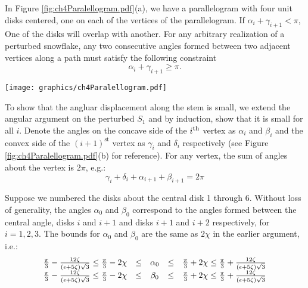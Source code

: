 In Figure \ref{fig:ch4Paralellogram.pdf}(a), we have a parallelogram with four unit disks centered, one on each of the vertices of the parallelogram.  
If $\alpha_i + \gamma_{i+1} < \pi$, One of the disks will overlap with another.  
For any arbitrary realization of a perturbed snowflake, any two consecutive angles formed between two adjacent vertices along a path must satisfy the following constraint $$\alpha_i + \gamma_{i+1} \geq \pi.$$

\begin{minipage}{\linewidth}
\begin{center}
\texttt{[image: graphics/ch4Paralellogram.pdf]}
\label{fig:ch4Paralellogram.pdf}
\end{center}
\end{minipage}

To show that the angluar displacement along the stem is small, we extend the angular argument on the perturbed $S_1$ and by induction, show that it is small for all $i$.  
Denote the angles on the concave side of the $i^\text{th}$ vertex as $\alpha_i$ and $\beta_i$ and the convex side of the $(i+1)^\text{st}$ vertex as $\gamma_i$ and $\delta_i$ respectively (see Figure \ref{fig:ch4Paralellogram.pdf}(b) for reference). 
For any vertex, the sum of angles about the vertex is $2 \pi$, e.g.:
$$\gamma_i + \delta_i + \alpha_{i+1} + \beta_{i+1} = 2 \pi$$ 

Suppose we numbered the disks about the central disk 1 through 6.  
Without loss of generality, the angles $\alpha_0$ and $\beta_0$ correspond to the angles formed between the central angle, disks $i$ and $i+1$ and disks $i+1$ and $i+2$ respectively, for $i = 1,2,3$.  
The bounds for $\alpha_0$ and $\beta_0$ are the same as $2\chi$ in the earlier argument, i.e.:
$$
\begin{array}{rcccl}
\frac{\pi}{3} - \frac{12 \zeta}{\left( \epsilon + 5 \zeta \right)\sqrt{3}} \leq \frac{\pi}{3} - 2 \chi &\leq& \alpha_0 &\leq& \frac{\pi}{3} + 2 \chi \leq \frac{\pi}{3} + \frac{12 \zeta}{\left( \epsilon + 5 \zeta \right)\sqrt{3}}\\
\frac{\pi}{3} - \frac{12 \zeta}{\left( \epsilon + 5 \zeta \right)\sqrt{3}}\leq \frac{\pi}{3} - 2 \chi &\leq& \beta_0  &\leq& \frac{\pi}{3} + 2 \chi \leq \frac{\pi}{3} + \frac{12 \zeta}{\left( \epsilon + 5 \zeta \right)\sqrt{3}}\\
\end{array}
$$

